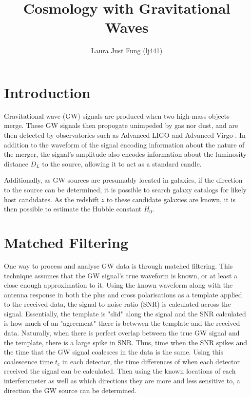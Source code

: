 \documentclass[11pt,a4paper]{article}
\title{Cosmology with Gravitational Waves}
\author{Laura Just Fung (lj441)}
\begin{document}
 

\maketitle
\newpage
\begin{abstract}
\end{abstract}
\newpage
\listoffigures
\newpage
\listoftables
\newpage
\tableofcontents
\newpage
\section{Introduction}
\label{sec:intro}
Gravitational wave (GW) signals are produced when two high-mass objects merge. These GW signals then propogate unimpeded by gas nor dust, and are then detected by observatories such as Advanced LIGO \citep{LIGO2015} and Advanced Virgo \citep{Acernese_2014}. In addition to the waveform of the signal encoding information about the nature of the merger, the signal's amplitude also encodes information about the luminosity distance $D_L$ to the source, allowing it to act as a standard candle. 

Additionally, as GW sources are presumably located in galaxies, if the direction to the source can be determined, it is possible to search galaxy catalogs for likely host candidates. As the redshift $z$ to these candidate galaxies are known, it is then possible to estimate the Hubble constant $H_0$. 

\section{Matched Filtering}
\label{sec:matched_filtering}
One way to process and analyse GW data is through matched filtering. This technique assumes that the GW signal's true waveform is known, or at least a close enough approximation to it. Using the known waveform along with the antenna response in both the plus and cross polarisations as a template applied to the received data, the signal to noise ratio (SNR) is calculated across the signal. Essentially, the template is "slid" along the signal and the SNR calculated is how much of an "agreement" there is betwwen the template and the received data. Naturally, when there is perfect overlap between the true GW signal and the template, there is a large spike in SNR. Thus, time when the SNR spikes and the time that the GW signal coalesces in the data is the same. Using this coalescence time $t_c$ in each detector, the time differences of when each detector received the signal can be calculated. Then using the known locations of each interferometer as well as which directions they are more and less sensitive to, a direction the GW source can be determined. 
\end{document}
